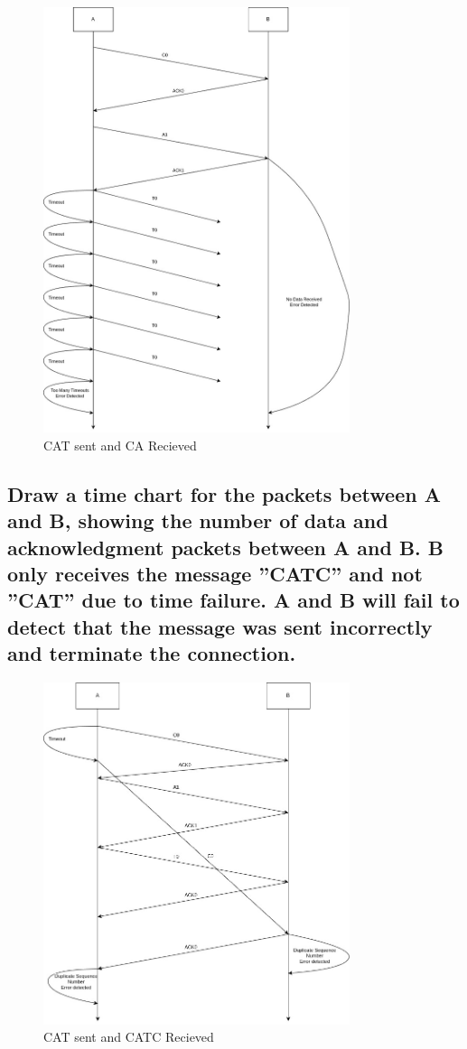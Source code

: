 \documentclass{article}
\begin{document}
\begin{figure}[H]
	\centering
	\includegraphics[width=0.8\textwidth]{question7/7b.jpg}
	\caption{CAT sent and CA Recieved}
	\label{fig:7b}
\end{figure}

\subsection{Draw a time chart for the packets between A and B, showing the number of
data and acknowledgment packets between A and B. B only receives the message ”CATC”
and not ”CAT” due to time failure. A and B will fail to detect that the message was sent
incorrectly and terminate the connection.}

\begin{figure}[H]
	\centering
	\includegraphics[width=0.8\textwidth]{question7/7c.jpg}
	\caption{CAT sent and CATC Recieved}
	\label{fig:7c}
\end{figure}
\end{document}
